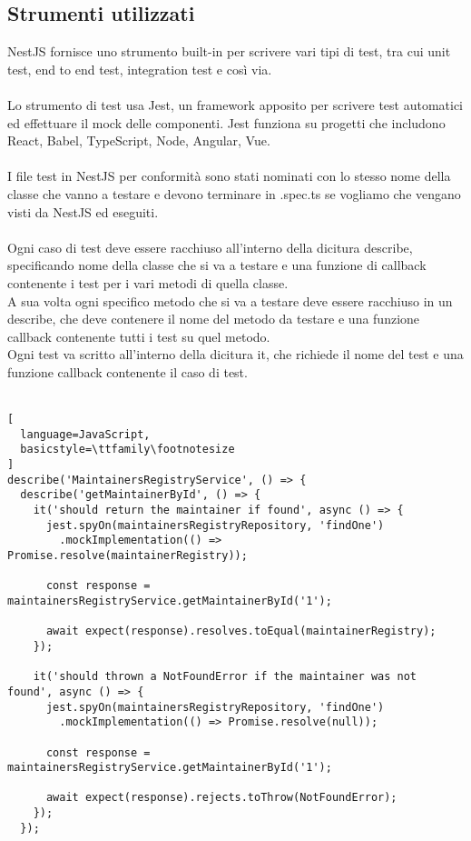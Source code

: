 \subsection{Strumenti utilizzati}
NestJS fornisce uno strumento built-in per scrivere vari tipi di test, tra cui unit test, 
end to end test, integration test e così via. 
\\\\
Lo strumento di test usa Jest, un framework apposito per scrivere test automatici ed effettuare 
il \gls{mock} delle componenti. Jest funziona su progetti che includono  React, Babel, TypeScript, Node,
Angular, Vue.
\\\\
I file test in NestJS per conformità sono stati nominati con lo stesso nome della classe che vanno
a testare e devono terminare in .spec.ts se vogliamo che vengano visti da NestJS ed eseguiti.
\\\\
Ogni caso di test deve essere racchiuso all'interno della dicitura describe, specificando nome della
classe che si va a testare e una funzione di callback contenente i test per i vari metodi di quella classe.
\\
A sua volta ogni specifico metodo che si va a testare deve essere racchiuso in un describe, che deve
contenere il nome del metodo da testare e una funzione callback contenente tutti i test su quel metodo.
\\
Ogni test va scritto all'interno della dicitura it, che richiede il nome del test e una funzione callback
contenente il caso di test.
\\\\
\begin{lstlisting}[
  language=JavaScript,
  basicstyle=\ttfamily\footnotesize
]
describe('MaintainersRegistryService', () => {
  describe('getMaintainerById', () => {
    it('should return the maintainer if found', async () => {
      jest.spyOn(maintainersRegistryRepository, 'findOne')
        .mockImplementation(() => Promise.resolve(maintainerRegistry));

      const response = maintainersRegistryService.getMaintainerById('1');

      await expect(response).resolves.toEqual(maintainerRegistry);
    });

    it('should thrown a NotFoundError if the maintainer was not found', async () => {
      jest.spyOn(maintainersRegistryRepository, 'findOne')
        .mockImplementation(() => Promise.resolve(null));

      const response = maintainersRegistryService.getMaintainerById('1');

      await expect(response).rejects.toThrow(NotFoundError);
    });
  });
\end{lstlisting}

